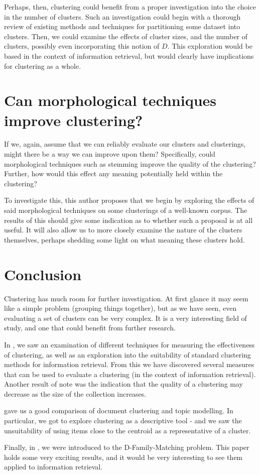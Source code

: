 \documentclass[sigconf,authorversion,nonacm]{acmart}
\begin{document}
Perhaps, then, clustering could benefit from a proper investigation into the choice in the number of clusters. Such an
investigation could begin with a thorough review of existing methods and techniques for partitioning some dataset into
clusters. Then, we could examine the effects of cluster sizes, and the number of clusters, possibly even incorporating
this notion of $D$. This exploration would be based in the context of information retrieval, but would clearly have
implications for clustering as a whole. \section{Can morphological techniques improve clustering?} If we, again, assume
that we can reliably evaluate our clusters and clusterings, might there be a way we can improve upon them? Specifically,
could morphological techniques such as stemming improve the quality of the clustering? Further, how would this effect
any meaning potentially held within the clustering?

To investigate this, this author proposes that we begin by exploring the effects of said morphological techniques on
some clusterings of a well-known corpus. The results of this should give some indication as to whether such a proposal
is at all useful. It will also allow us to more closely examine the nature of the clusters themselves, perhaps shedding
some light on what meaning these clusters hold. \section{Conclusion} Clustering has much room for further investigation.
At first glance it may seem like a simple problem (grouping things together), but as we have seen, even evaluating a set
of clusters can be very complex. It is a very interesting field of study, and one that could benefit from further
research.

In \cite{Yuan2022}, we saw an examination of different techniques for measuring the effectiveness of clustering, as well
as an exploration into the suitability of standard clustering methods for information retrieval. From this we have
discovered several measures that can be used to evaluate a clustering (in the context of information retrieval). Another
result of note was the indication that the quality of a clustering may decrease as the size of the collection increases.

\cite{Yuan2021} gave us a good comparison of document clustering and topic modelling. In particular, we got to explore
clustering as a descriptive tool - and we saw the unsuitability of using items close to the centroid as a representative
of a cluster.

Finally, in \cite{Cazals2019}, we were introduced to the D-Family-Matching problem. This paper holds some very exciting
results, and it would be very interesting to see them applied to information retrieval. \section*{}
 
\end{document}
